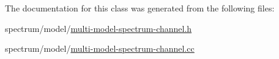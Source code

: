The documentation for this class was generated from the following files\+:\begin{DoxyCompactItemize}
\item 
spectrum/model/\hyperlink{multi-model-spectrum-channel_8h}{multi-\/model-\/spectrum-\/channel.\+h}\item 
spectrum/model/\hyperlink{multi-model-spectrum-channel_8cc}{multi-\/model-\/spectrum-\/channel.\+cc}\end{DoxyCompactItemize}
